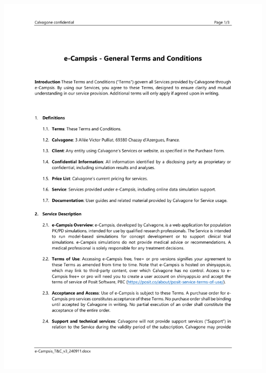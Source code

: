 \documentclass[
]{book}
\begin{document}
\includegraphics[width=21cm,height=29cm]{pictures/e-Campsis_T&C_v3_240911.pdf}
\end{document}
